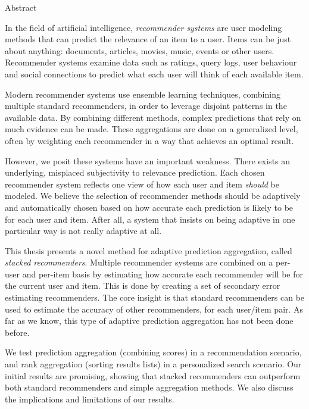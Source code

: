 \null\vspace{3em}
{
  \centering
  \normalfont
  \huge
  Abstract\\
}
\vspace{2em}

\noindent
In the field of artificial intelligence,
\emph{recommender systems} are user modeling methods
that can predict the relevance of an item to a user.
Items can be just about anything: 
documents, articles, movies, music, events or other users.
Recommender systems examine data such as ratings, query logs,
user behaviour and social connections to predict
what each user will think of each available item.

Modern recommender systems use ensemble learning techniques,
combining multiple standard recommenders,
in order to leverage disjoint patterns in the available data.
By combining different methods,
complex predictions that rely on much evidence can be made.
These aggregations are done on a generalized level,
often by weighting each recommender in a way
that achieves an optimal result.

However, we posit these systems have an important weakness.
There exists an underlying, misplaced subjectivity to relevance prediction.
Each chosen recommender system reflects one view of 
how each user and item \emph{should} be modeled.
We believe the selection of recommender methods should 
be adaptively and automatically chosen based on
how accurate each prediction is likely to be for each user and item.
After all, a system that insists on being adaptive
in one particular way is not really adaptive at all.

This thesis presents a novel method for adaptive prediction aggregation,
called \emph{stacked recommenders}.
Multiple recommender systems are combined on a per-user and per-item basis
by estimating how accurate each recommender will be for the current user and item.
This is done by creating a set of secondary error estimating recommenders.
The core insight is that standard recommenders can be used
to estimate the accuracy of other recommenders, for each
user/item pair.
As far as we know, this type of adaptive prediction aggregation
has not been done before.

We test prediction aggregation (combining scores) in a
recommendation scenario,
and rank aggregation (sorting results lists) in a personalized search scenario.
Our initial results are promising, showing that stacked recommenders
can outperform both standard recommenders and simple aggregation methods.
We also discuss the implications and limitations of our results.

\cleardoublepage
